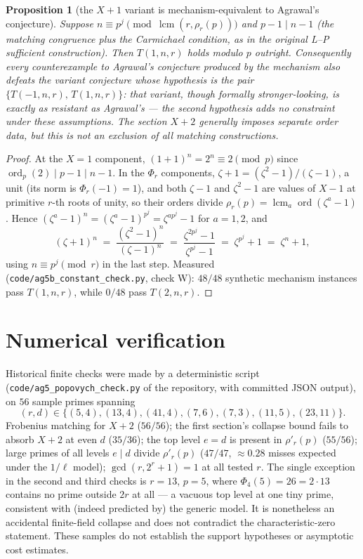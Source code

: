 \documentclass[11pt]{article}
\newtheorem{proposition}[theorem]{Proposition}
\theoremstyle{remark}
\DeclareMathOperator{\lcm}{lcm}
\DeclareMathOperator{\ord}{ord}
\begin{document}
\begin{proposition}[the $X+1$ variant is mechanism-equivalent to
Agrawal's conjecture]\label{prop:xplus1}
Suppose $n \equiv p^{j} \pmod{\lcm(r, \rho_r(p))}$ and $p - 1 \mid n - 1$
(the matching congruence plus the Carmichael condition, as in the original
L--P sufficient construction). Then $T(1, n, r)$ holds modulo
$p$ outright. Consequently every counterexample to Agrawal's conjecture
produced by the mechanism also defeats the variant conjecture whose
hypothesis is the pair $\{T(-1,n,r),\, T(1,n,r)\}$: that variant, though
formally stronger-looking, is exactly as resistant as Agrawal's --- the
second hypothesis adds no constraint under these assumptions. The section
$X+2$ generally imposes separate order data, but this is not an exclusion
of all matching constructions.
\end{proposition}

\begin{proof}
At the $X = 1$ component, $(1+1)^n = 2^n \equiv 2 \pmod p$ since
$\ord_p(2) \mid p - 1 \mid n - 1$. In the $\Phi_r$ components,
$\zeta + 1 = (\zeta^2 - 1)/(\zeta - 1)$, a unit (its norm is
$\Phi_r(-1) = 1$), and both $\zeta - 1$ and $\zeta^2 - 1$ are values of
$X - 1$ at primitive $r$-th roots of unity, so their orders divide
$\rho_r(p) = \lcm_a \ord(\zeta^a - 1)$. Hence
$(\zeta^a - 1)^n = (\zeta^a - 1)^{p^j} = \zeta^{a p^j} - 1$ for
$a = 1, 2$, and
\[
(\zeta + 1)^n \;=\; \frac{(\zeta^2 - 1)^n}{(\zeta - 1)^n}
\;=\; \frac{\zeta^{2p^j} - 1}{\zeta^{p^j} - 1}
\;=\; \zeta^{p^j} + 1 \;=\; \zeta^n + 1,
\]
using $n \equiv p^j \pmod r$ in the last step. Measured
(\texttt{code/ag5b\_constant\_check.py}, check W): $48/48$ synthetic
mechanism instances pass $T(1, n, r)$, while $0/48$ pass $T(2, n, r)$.
\end{proof}

\section{Numerical verification}

Historical finite checks were made by a deterministic script
(\texttt{code/ag5\_popovych\_check.py} of the repository, with committed
JSON output), on $56$ sample primes spanning
\[
(r,d)\in\{(5,4),(13,4),(41,4),(7,6),(7,3),(11,5),(23,11)\}.
\]
Frobenius matching for $X+2$
($56/56$); the first section's collapse bound fails to absorb $X + 2$ at
even $d$ ($35/36$); the top level $e = d$ is present in $\rho'_r(p)$
($55/56$); large primes of all levels $e \mid d$ divide $\rho'_r(p)$
($47/47$, $\approx 0.28$ misses expected under the $1/\ell$ model);
$\gcd(r, 2^r + 1) = 1$ at all tested $r$. The single exception in the
second and third checks is $r = 13$, $p = 5$, where $\Phi_4(5) = 26 =
2 \cdot 13$ contains no prime outside $2r$ at all --- a vacuous top
level at one tiny prime, consistent with (indeed predicted by) the
generic model. It is nonetheless an accidental finite-field collapse and
does not contradict the characteristic-zero statement. These samples do
not establish the support hypotheses or asymptotic cost estimates.
\end{document}

